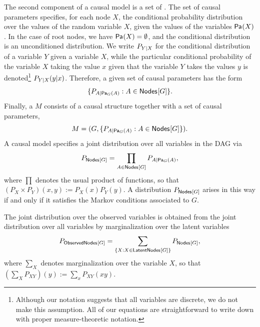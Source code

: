  The second component of a causal model is a set of  .
The set of causal parameters specifies, for each node $X$, the conditional probability distribution over the values of the random variable $X$, given the values of the variables $\Pa{X}$.  In the case of root nodes, we have $\Pa{X} = \emptyset$, and the conditional distribution is an unconditioned distribution.
We write $\pfunc{Y|X}$ for the conditional distribution of a variable $Y$ given a variable $X$, while the particular conditional probability of the variable $X$ taking the value $x$ given that the variable $Y$ takes the values $y$ is denoted\footnote{Although our notation suggests that all variables are discrete, we do not make this assumption.  All of our equations are straightforward to write down with proper measure-theoretic notation.} $\pdf[Y|X]{y|x}$.    Therefore, a given set of causal parameters has the form
\begin{align}
 \{ \pfunc{A|\Pa[G]{A}} : A \in \SmallNamedFunction{Nodes}{G} \}.
\end{align}
Finally, a  $M$ consists of a causal structure together with a set of causal parameters,
\[
	M = ( G,   \{ \pfunc{A|\Pa[G]{A}} : A \in \SmallNamedFunction{Nodes}{G} \}).
\]
A causal model specifies a joint distribution over all variables in the DAG via
\begin{align}\label{Markov}
P_{\nodes{G}} = \prod_{A\in \SmallNamedFunction{Nodes}{G}} \pfunc{A|\Pa[G]{A}},
\end{align}
where $\prod$ denotes the usual product of functions, so that $(P_X \times P_Y)(x,y) := P_X(x) P_Y(y)$. A distribution $P_{\nodes{G}}$ arises in this way if and only if it satisfies the Markov conditions associated to $G$.

The joint distribution over the observed variables is obtained from the joint distribution over all variables by marginalization over the latent variables 
\begin{align}\label{MarkovObserved}
P_{\SmallNamedFunction{ObservedNodes}{G}} =  \sum_{\{X :X \in\SmallNamedFunction{LatentNodes}{G}\}} P_{\SmallNamedFunction{Nodes}{G}},
\end{align}
where $\sum_X$ denotes marginalization over the variable $X$, so that $(\sum_X P_{XY})(y):= \sum_x P_{XY}(xy)$.


